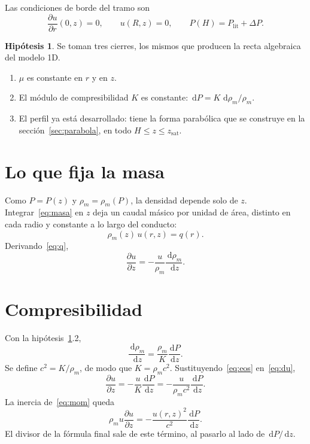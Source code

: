 \documentclass[11pt,a4paper]{article}
\newcommand{\dd}{\,\mathrm{d}}
\newcommand{\p}{\partial}
\newcommand{\sat}{\mathrm{sat}}
\newcommand{\lit}{\mathrm{lit}}
\theoremstyle{plain}
\theoremstyle{definition}
\newtheorem{hipotesis}{Hipótesis}
\theoremstyle{remark}
\begin{document}
Las condiciones de borde del tramo son
\begin{equation}
\frac{\p u}{\p r}(0,z)=0,
\qquad
u(R,z)=0,
\qquad
P(H)=P_{\lit}+\Delta P.
\label{eq:bc}
\end{equation}

\begin{hipotesis}
\label{hip:cierre}
Se toman tres cierres, los mismos que producen la recta algebraica del modelo
1D.
\begin{enumerate}
\item \(\mu\) es constante en \(r\) y en \(z\).
\item El módulo de compresibilidad \(K\) es constante:
      \(\dd P=K\,\dd\rho_m/\rho_m\).
\item El perfil ya está desarrollado: tiene la forma parabólica que se
      construye en la sección~\ref{sec:parabola}, en todo
      \(H\le z\le z_{\sat}\).
\end{enumerate}
\end{hipotesis}

\section{Lo que fija la masa}

Como \(P=P(z)\) y \(\rho_m=\rho_m(P)\), la densidad depende solo de \(z\).
Integrar~\eqref{eq:masa} en \(z\) deja un caudal másico por unidad de área,
distinto en cada radio y constante a lo largo del conducto:
\begin{equation}
\rho_m(z)\,u(r,z)=q(r).
\label{eq:q}
\end{equation}
Derivando~\eqref{eq:q},
\begin{equation}
\frac{\p u}{\p z}
=
-\frac{u}{\rho_m}\frac{\dd\rho_m}{\dd z}.
\label{eq:du}
\end{equation}

\section{Compresibilidad}

Con la hipótesis~\ref{hip:cierre}.2,
\begin{equation}
\frac{\dd\rho_m}{\dd z}
=
\frac{\rho_m}{K}\frac{\dd P}{\dd z}.
\label{eq:eos}
\end{equation}
Se define \(c^2=K/\rho_m\), de modo que \(K=\rho_m c^2\).
Sustituyendo~\eqref{eq:eos} en~\eqref{eq:du},
\begin{equation}
\frac{\p u}{\p z}
=
-\frac{u}{K}\frac{\dd P}{\dd z}
=
-\frac{u}{\rho_m c^2}\frac{\dd P}{\dd z}.
\label{eq:duP}
\end{equation}
La inercia de~\eqref{eq:mom} queda
\begin{equation}
\rho_m u\frac{\p u}{\p z}
=
-\frac{u(r,z)^2}{c^2}\frac{\dd P}{\dd z}.
\label{eq:inercia}
\end{equation}
El divisor de la fórmula final sale de este término, al pasarlo al lado de
\(\dd P/\dd z\).
\end{document}
